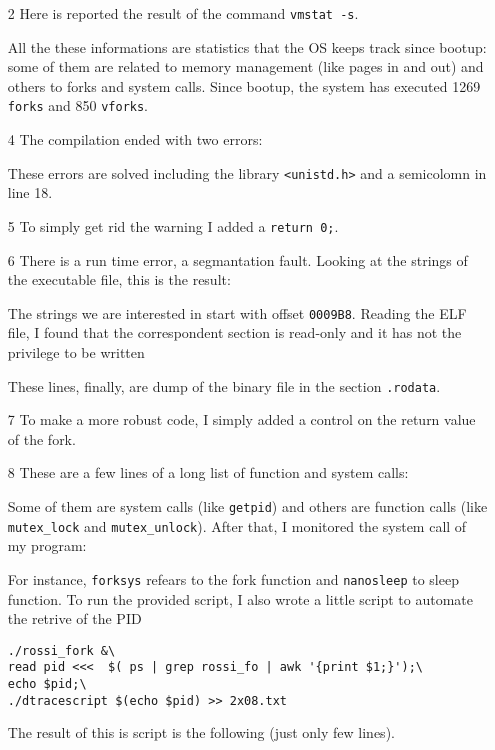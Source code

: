 \documentclass{article}
\begin{document}
\begin{itemize}

\item[2]
Here is reported the result of the command \texttt{vmstat -s}.

All the these informations are statistics that the OS keeps track since bootup: some of them are related to memory
management (like pages in and out) and others to forks and system calls. Since bootup, the system has executed 
1269 \texttt{forks} and 850 \texttt{vforks}.

\item[4]
The compilation ended with two errors:

These errors are solved including the library \texttt{<unistd.h>} and a semicolomn in line 18.

\item[5] 
To simply get rid the warning I added a \texttt{return 0;}.

\item[6]
There is a run time error, a segmantation fault. 
Looking at the strings of the executable file, this is the result:

The strings we are interested in start with offset \texttt{0009B8}. Reading the ELF file, I found that the 
correspondent section is read-only and it has not the privilege to be written 

These lines, finally, are dump of the binary file in the section \texttt{.rodata}.




\item[7]
To make a more robust code, I simply added a control on the return value of the fork.


\item[8]
These are a few lines of a long list of function and system calls:

Some of them are system calls (like \texttt{getpid}) and others are function calls (like \texttt{mutex\_lock} and \texttt{mutex\_unlock}).
After that, I monitored the system call of my program:

For instance, \texttt{forksys} refears to the fork function and \texttt{nanosleep} to sleep function.
To run the provided script, I also wrote a little script to automate the retrive of the PID
\begin{lstlisting}
./rossi_fork &\
read pid <<<  $( ps | grep rossi_fo | awk '{print $1;}');\
echo $pid;\
./dtracescript $(echo $pid) >> 2x08.txt 
\end{lstlisting}
The result of this is script is the following (just only few lines).



\end{itemize}
\end{document}
